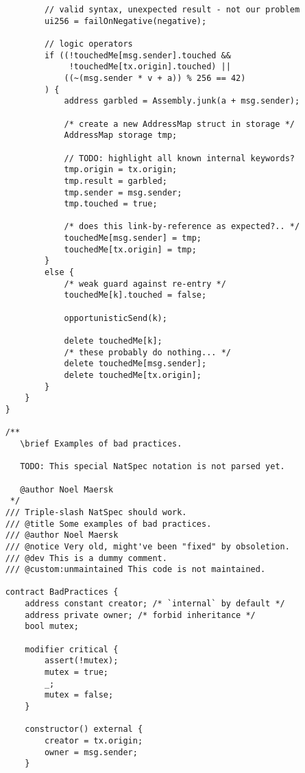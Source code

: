 \documentclass[runningheads]{llncs}
\begin{document}
\begin{verbatim}
            // valid syntax, unexpected result - not our problem
            ui256 = failOnNegative(negative);
            
            // logic operators
            if ((!touchedMe[msg.sender].touched &&
                 !touchedMe[tx.origin].touched) ||
                ((~(msg.sender * v + a)) % 256 == 42)
            ) {
                address garbled = Assembly.junk(a + msg.sender);
    
                /* create a new AddressMap struct in storage */
                AddressMap storage tmp;
    
                // TODO: highlight all known internal keywords?
                tmp.origin = tx.origin;
                tmp.result = garbled;
                tmp.sender = msg.sender;
                tmp.touched = true;
    
                /* does this link-by-reference as expected?.. */
                touchedMe[msg.sender] = tmp;
                touchedMe[tx.origin] = tmp;
            }
            else {
                /* weak guard against re-entry */
                touchedMe[k].touched = false;
                
                opportunisticSend(k);
                
                delete touchedMe[k];
                /* these probably do nothing... */
                delete touchedMe[msg.sender];
                delete touchedMe[tx.origin];
            }
        }
    }
    
    /**
       \brief Examples of bad practices.
    
       TODO: This special NatSpec notation is not parsed yet.
    
       @author Noel Maersk
     */
    /// Triple-slash NatSpec should work.
    /// @title Some examples of bad practices.
    /// @author Noel Maersk
    /// @notice Very old, might've been "fixed" by obsoletion.
    /// @dev This is a dummy comment.
    /// @custom:unmaintained This code is not maintained.
    
    contract BadPractices {
        address constant creator; /* `internal` by default */
        address private owner; /* forbid inheritance */
        bool mutex;
    
        modifier critical {
            assert(!mutex);
            mutex = true;
            _;
            mutex = false;
        }
        
        constructor() external {
            creator = tx.origin;
            owner = msg.sender;
        }
    

\end{verbatim}
\end{document}
